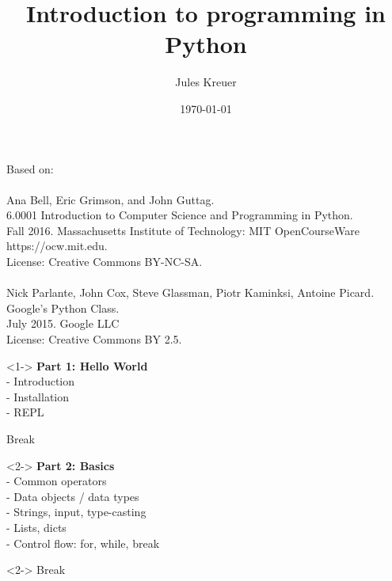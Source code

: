 \documentclass{beamer}
\title[]{Introduction to programming in Python} %
\author{Jules Kreuer} %
\institute[FSI] %
{
Uni Tübingen\\ %
\medskip
\textit{fsi@fsi.uni-tuebingen.de}\\
\textit{contact@juleskreuer.eu}\\
}
\date{\today} %
\begin{document}
\begin{frame}
\titlepage %
\end{frame}


\begin{frame}
	Based on:\\\\
	Ana Bell, Eric Grimson, and John Guttag. \\
	6.0001 Introduction to Computer Science and Programming in Python.\\
	Fall 2016. Massachusetts Institute of Technology: MIT OpenCourseWare\\
	https://ocw.mit.edu.\\
	License: Creative Commons BY-NC-SA.\\\\
	
	Nick Parlante, John Cox, Steve Glassman, Piotr Kaminksi, Antoine Picard.\\
	Google's Python Class.\\
	July 2015. Google LLC\\
	License: Creative Commons BY 2.5.	
\end{frame}

\begin{frame}
	\begin{block}{}<1->
		\textbf{Part 1: Hello World}\\
		- Introduction\\ 
		- Installation \\
		- REPL\\
	\end{block}
	\begin{exampleblock}{}
	Break
	\end{exampleblock}
	\begin{block}{}<2->
	\textbf{Part 2: Basics}\\
	- Common operators\\
	- Data objects / data types\\
	- Strings, input, type-casting\\
	- Lists, dicts\\
	- Control flow: for, while, break
	\end{block}
	\begin{exampleblock}{}<2->
		Break
	\end{exampleblock}
\end{frame}
\end{document}
